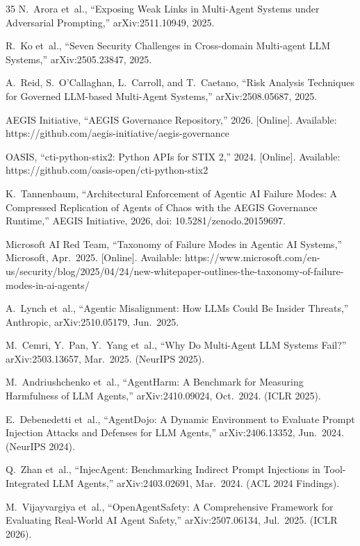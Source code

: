 \documentclass{IEEEoj-data}
\newcommand{\added}[1]{#1}
\begin{document}
\begin{thebibliography}{35}
N.~Arora et~al., ``Exposing Weak Links in Multi-Agent Systems under Adversarial Prompting,'' arXiv:2511.10949, 2025.

R.~Ko et~al., ``Seven Security Challenges in Cross-domain Multi-agent LLM Systems,'' arXiv:2505.23847, 2025.

A.~Reid, S.~O'Callaghan, L.~Carroll, and T.~Caetano, ``Risk Analysis Techniques for Governed LLM-based Multi-Agent Systems,'' arXiv:2508.05687, 2025.

AEGIS Initiative, ``AEGIS Governance Repository,'' 2026. [Online]. Available: https://github.com/aegis-initiative/aegis-governance

OASIS, ``cti-python-stix2: Python APIs for STIX 2,'' 2024. [Online]. Available: https://github.com/oasis-open/cti-python-stix2

\added{K.~Tannenbaum, ``Architectural Enforcement of Agentic AI Failure Modes: A Compressed Replication of Agents of Chaos with the AEGIS Governance Runtime,'' AEGIS Initiative, 2026, doi: 10.5281/zenodo.20159697.}

\added{Microsoft AI Red Team, ``Taxonomy of Failure Modes in Agentic AI Systems,'' Microsoft, Apr.\ 2025. [Online]. Available: https://www.microsoft.com/en-us/security/blog/2025/04/24/new-whitepaper-outlines-the-taxonomy-of-failure-modes-in-ai-agents/}

\added{A.~Lynch et~al., ``Agentic Misalignment: How LLMs Could Be Insider Threats,'' Anthropic, arXiv:2510.05179, Jun.\ 2025.}

\added{M.~Cemri, Y.~Pan, Y.~Yang et~al., ``Why Do Multi-Agent LLM Systems Fail?'' arXiv:2503.13657, Mar.\ 2025. (NeurIPS 2025).}

\added{M.~Andriushchenko et~al., ``AgentHarm: A Benchmark for Measuring Harmfulness of LLM Agents,'' arXiv:2410.09024, Oct.\ 2024. (ICLR 2025).}

\added{E.~Debenedetti et~al., ``AgentDojo: A Dynamic Environment to Evaluate Prompt Injection Attacks and Defenses for LLM Agents,'' arXiv:2406.13352, Jun.\ 2024. (NeurIPS 2024).}

\added{Q.~Zhan et~al., ``InjecAgent: Benchmarking Indirect Prompt Injections in Tool-Integrated LLM Agents,'' arXiv:2403.02691, Mar.\ 2024. (ACL 2024 Findings).}

\added{M.~Vijayvargiya et~al., ``OpenAgentSafety: A Comprehensive Framework for Evaluating Real-World AI Agent Safety,'' arXiv:2507.06134, Jul.\ 2025. (ICLR 2026).}


\end{thebibliography}
\end{document}
